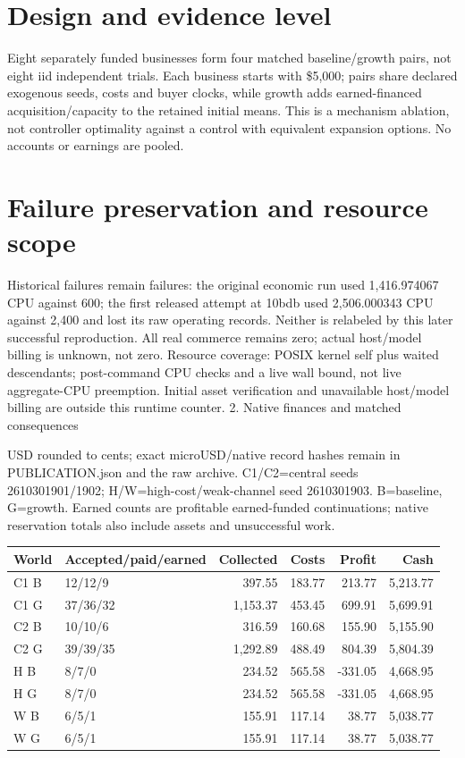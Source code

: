 \documentclass[10pt,letterpaper]{article}
\begin{document}
\section*{Design and evidence level}
Eight separately funded businesses form four matched baseline/growth pairs, not eight iid independent trials. Each business starts with \$5,000; pairs share declared exogenous seeds, costs and buyer clocks, while growth adds earned-financed acquisition/capacity to the retained initial means. This is a mechanism ablation, not controller optimality against a control with equivalent expansion options. No accounts or earnings are pooled.
\section*{Failure preservation and resource scope}
Historical failures remain failures: the original economic run used 1,416.974067 CPU against 600; the first released attempt at 10bdb used 2,506.000343 CPU against 2,400 and lost its raw operating records. Neither is relabeled by this later successful reproduction. All real commerce remains zero; actual host/model billing is unknown, not zero.
\small Resource coverage: POSIX kernel self plus waited descendants; post-command CPU checks and a live wall bound, not live aggregate-CPU preemption. Initial asset verification and unavailable host/model billing are outside this runtime counter.\normalsize
\newpage
{\Large 2. Native finances and matched consequences}\par
\small USD rounded to cents; exact microUSD/native record hashes remain in PUBLICATION.json and the raw archive. C1/C2=central seeds 2610301901/1902; H/W=high-cost/weak-channel seed 2610301903. B=baseline, G=growth. Earned counts are profitable earned-funded continuations; native reservation totals also include assets and unsuccessful work.\par
\par\noindent\begin{tabularx}{\linewidth}{@{}lXrrrr@{}}\toprule World & Accepted/paid/earned & Collected & Costs & Profit & Cash \\ \midrule
C1 B & 12/12/9 & 397.55 & 183.77 & 213.77 & 5,213.77 \\
C1 G & 37/36/32 & 1,153.37 & 453.45 & 699.91 & 5,699.91 \\
C2 B & 10/10/6 & 316.59 & 160.68 & 155.90 & 5,155.90 \\
C2 G & 39/39/35 & 1,292.89 & 488.49 & 804.39 & 5,804.39 \\
H B & 8/7/0 & 234.52 & 565.58 & -331.05 & 4,668.95 \\
H G & 8/7/0 & 234.52 & 565.58 & -331.05 & 4,668.95 \\
W B & 6/5/1 & 155.91 & 117.14 & 38.77 & 5,038.77 \\
W G & 6/5/1 & 155.91 & 117.14 & 38.77 & 5,038.77 \\\bottomrule\end{tabularx}\par
\end{document}
